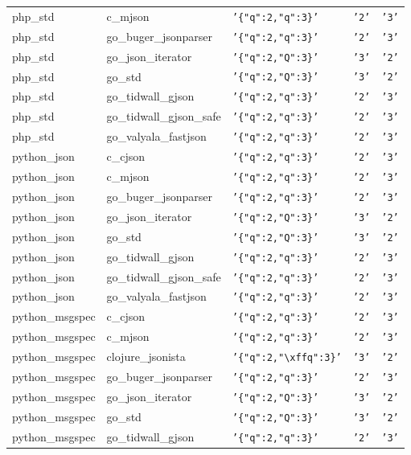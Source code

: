 \documentclass[english, 12pt, a4paper, sci, utf8, a-2b, online]{aaltothesis}
\def\str#1{\texttt{'#1'}}
\begin{document}
\begin{longtable}{lllll}
    php\_std & c\_mjson & \str{\{"q":2,"q":3\}} & \str{2} & \str{3} \\
    php\_std & go\_buger\_jsonparser & \str{\{"q":2,"q":3\}} & \str{2} & \str{3} \\
    php\_std & go\_json\_iterator & \str{\{"q":2,"Q":3\}} & \str{3} & \str{2} \\
    php\_std & go\_std & \str{\{"q":2,"Q":3\}} & \str{3} & \str{2} \\
    php\_std & go\_tidwall\_gjson & \str{\{"q":2,"q":3\}} & \str{2} & \str{3} \\
    php\_std & go\_tidwall\_gjson\_safe & \str{\{"q":2,"q":3\}} & \str{2} & \str{3} \\
    php\_std & go\_valyala\_fastjson & \str{\{"q":2,"q":3\}} & \str{2} & \str{3} \\
    python\_json & c\_cjson & \str{\{"q":2,"q":3\}} & \str{2} & \str{3} \\
    python\_json & c\_mjson & \str{\{"q":2,"q":3\}} & \str{2} & \str{3} \\
    python\_json & go\_buger\_jsonparser & \str{\{"q":2,"q":3\}} & \str{2} & \str{3} \\
    python\_json & go\_json\_iterator & \str{\{"q":2,"Q":3\}} & \str{3} & \str{2} \\
    python\_json & go\_std & \str{\{"q":2,"Q":3\}} & \str{3} & \str{2} \\
    python\_json & go\_tidwall\_gjson & \str{\{"q":2,"q":3\}} & \str{2} & \str{3} \\
    python\_json & go\_tidwall\_gjson\_safe & \str{\{"q":2,"q":3\}} & \str{2} & \str{3} \\
    python\_json & go\_valyala\_fastjson & \str{\{"q":2,"q":3\}} & \str{2} & \str{3} \\
    python\_msgspec & c\_cjson & \str{\{"q":2,"q":3\}} & \str{2} & \str{3} \\
    python\_msgspec & c\_mjson & \str{\{"q":2,"q":3\}} & \str{2} & \str{3} \\
    python\_msgspec & clojure\_jsonista & \str{\{"q":2,"\textbackslash xffq":3\}} & \str{3} & \str{2} \\
    python\_msgspec & go\_buger\_jsonparser & \str{\{"q":2,"q":3\}} & \str{2} & \str{3} \\
    python\_msgspec & go\_json\_iterator & \str{\{"q":2,"Q":3\}} & \str{3} & \str{2} \\
    python\_msgspec & go\_std & \str{\{"q":2,"Q":3\}} & \str{3} & \str{2} \\
    python\_msgspec & go\_tidwall\_gjson & \str{\{"q":2,"q":3\}} & \str{2} & \str{3} \\

\end{longtable}
\end{document}
